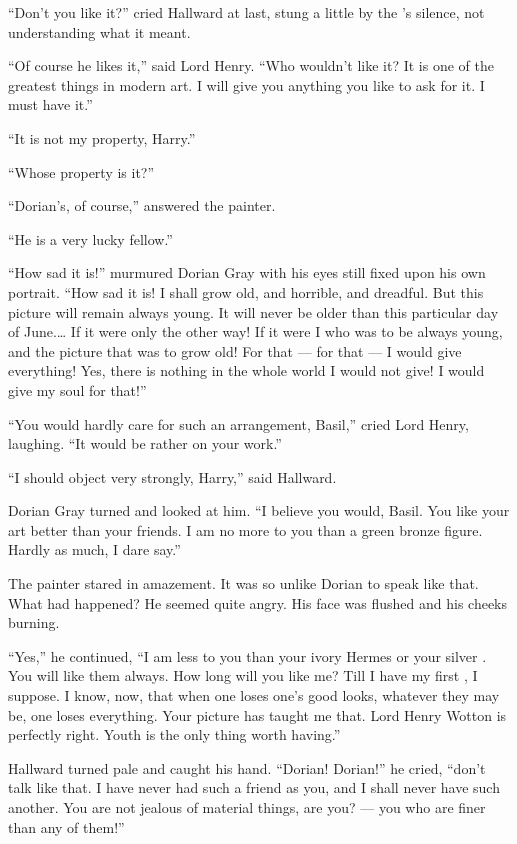 \documentclass{fiche}
\begin{document}
\begin{texte}
``Don't you like it?'' cried Hallward at last, stung a little by the 's silence, not understanding what it meant.

``Of course he likes it,'' said Lord Henry. ``Who wouldn't like it? It is one of the greatest
things in modern art. I will give you anything you like to ask for it. I must have it.''

``It is not my property, Harry.''

``Whose property is it?''

``Dorian's, of course,'' answered the painter.

``He is a very lucky fellow.''

``How sad it is!'' murmured Dorian Gray with his eyes still fixed upon his own portrait. ``How
sad it is! I shall grow old, and horrible, and dreadful. But this picture will remain always
young. It will never be older than this particular day of June.\ldots{} If it were only the
other way! If it were I who was to be always young, and the picture that was to grow old! For
that --- for that --- I would give everything! Yes, there is nothing in the whole world I
would not give! I would give my soul for that!''

``You would hardly care for such an arrangement, Basil,'' cried Lord Henry, laughing. ``It
would be rather  on your work.''

``I should object very strongly, Harry,'' said Hallward.

Dorian Gray turned and looked at him. ``I believe you would, Basil. You like your art better
than your friends. I am no more to you than a green bronze figure. Hardly as much, I dare
say.''

The painter stared in amazement. It was so unlike Dorian to speak like that. What had
happened? He seemed quite angry. His face was flushed and his cheeks burning.

``Yes,'' he continued, ``I am less to you than your ivory Hermes or your silver
. You will like them always. How long will you like me? Till I have
my first , I suppose. I know, now, that when one loses one's
good looks, whatever they may be, one loses everything. Your picture has taught me that. Lord
Henry Wotton is perfectly right. Youth is the only thing worth having.''

Hallward turned pale and caught his hand. ``Dorian! Dorian!'' he cried, ``don't talk like
that. I have never had such a friend as you, and I shall never have such another. You are not
jealous of material things, are you? --- you who are finer than any of them!''


\end{texte}
\end{document}
